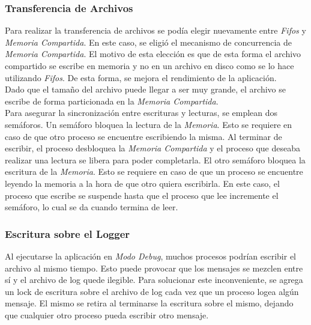 \documentclass[a4paper,10pt]{article}
\begin{document}
			\subsubsection{Transferencia de Archivos}
			Para realizar la transferencia de archivos se pod\'ia elegir nuevamente entre \emph{Fifos} y \emph{Memoria Compartida}. En este caso,
			se eligi\'o el mecanismo de concurrencia de \emph{Memoria Compartida}. El motivo de esta elecci\'on es que de esta forma el archivo
			compartido se escribe en memoria y no en un archivo en disco como se lo hace utilizando \emph{Fifos}. De esta forma, se mejora el 
			rendimiento de la aplicaci\'on. \\
			\indent Dado que el tama\~no del archivo puede llegar a ser muy grande, el archivo se escribe de forma particionada en la 
			\emph{Memoria Compartida}. \\
			\indent Para asegurar la sincronizaci\'on entre escrituras y lecturas, se emplean dos sem\'aforos. Un sem\'aforo bloquea 
			la lectura de la \emph{Memoria}. Esto se requiere en caso de que otro proceso se encuentre escribiendo la misma. Al terminar
			de escribir, el proceso desbloquea la \emph{Memoria Compartida} y el proceso que deseaba realizar una lectura se libera para
			poder completarla. El otro sem\'aforo bloquea la escritura de la \emph{Memoria}. Esto se requiere en caso de que un proceso
			se encuentre leyendo la memoria a la hora de que otro quiera escribirla. En este caso, el proceso que escribe se suspende 
			hasta que el proceso que lee incremente el sem\'aforo, lo cual se da cuando termina de leer.
			

			\subsubsection{Escritura sobre el Logger} 
				Al ejecutarse la aplicaci\'on en \emph{Modo Debug}, muchos procesos podr\'ian escribir el archivo al mismo tiempo. Esto
			puede provocar que los mensajes se mezclen entre s\'i y el archivo de log quede ilegible.
			Para solucionar este inconveniente, se agrega un lock de escritura sobre el archivo de log cada vez que un proceso logea
			alg\'un mensaje. El mismo se retira al terminarse la escritura sobre el mismo, dejando que cualquier otro proceso pueda 
			escribir otro mensaje.

			
			
		
		

				
\end{document}
